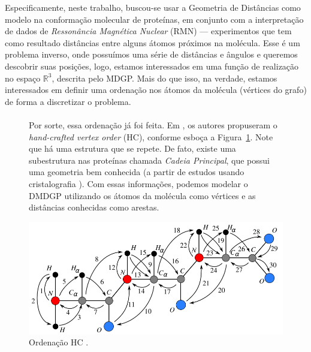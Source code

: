 \documentclass[a4,11pt]{pssbmac}
\begin{document}
	Especificamente, neste trabalho, buscou-se usar a Geometria de Distâncias como modelo na conformação molecular de proteínas, em conjunto com a interpretação de dados de \textit{Ressonância Magnética Nuclear} (RMN) --- experimentos que tem como resultado distâncias entre alguns átomos próximos na molécula. Esse é um problema inverso, onde possuímos uma série de distâncias e ângulos e queremos descobrir suas posições, logo, estamos interessados em uma função de realização no espaço $\mathbb{R}^3$, descrita pelo MDGP. Mais do que isso, na verdade, estamos interessados em definir uma ordenação nos átomos da molécula (vértices do grafo) de forma a discretizar o problema.
	
	\vspace{-0.25cm}
	\begin{figure}[h!]
		\centering
		\begin{minipage}{0.43\linewidth}   
			\paragraph{} Por sorte, essa ordenação já foi feita. Em \cite{carlile:MinimalOrder}, os autores propuseram o \textit{hand-crafted vertex order} (HC), conforme esboça a Figura~\ref{fig:hcVO}. Note que há uma estrutura que se repete. De fato, existe uma subestrutura nas proteínas chamada \textit{Cadeia Principal}, que possui uma geometria bem conhecida (a partir de estudos usando cristalografia \cite{fidalgotese}). Com essas informações, podemos modelar o DMDGP utilizando os átomos da molécula como vértices e as distâncias conhecidas como arestas.
		\end{minipage}
		\begin{minipage}{0.563\linewidth}
			\includegraphics[scale=0.585]{hcVO.png}
			\caption{Ordenação HC \cite{carlile:MinimalOrder}.}
			\label{fig:hcVO}
		\end{minipage}
	\end{figure}
	\vspace{-0.25cm}
	
\end{document}

